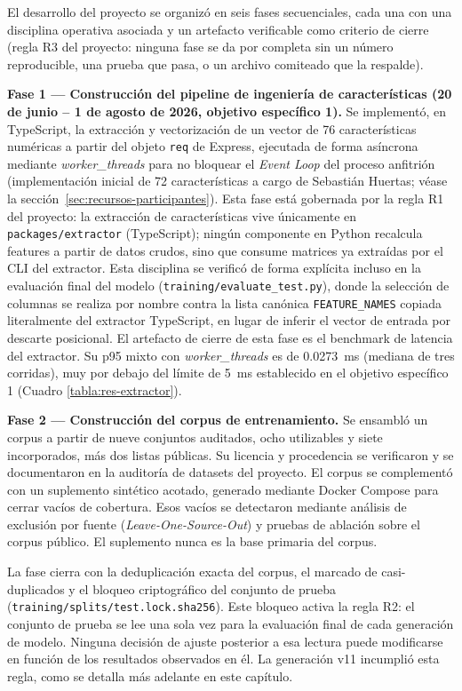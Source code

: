 El desarrollo del proyecto se organizó en seis fases secuenciales, cada una con una disciplina operativa asociada y un artefacto verificable como criterio de cierre (regla R3 del proyecto: ninguna fase se da por completa sin un número reproducible, una prueba que pasa, o un archivo comiteado que la respalde).

\textbf{Fase 1 --- Construcción del pipeline de ingeniería de características (20 de junio -- 1 de agosto de 2026, objetivo específico 1).} Se implementó, en TypeScript, la extracción y vectorización de un vector de 76 características numéricas a partir del objeto \texttt{req} de Express, ejecutada de forma asíncrona mediante \textit{worker\_threads} para no bloquear el \textit{Event Loop} del proceso anfitrión (implementación inicial de 72 características a cargo de Sebastián Huertas; véase la sección~\ref{sec:recursos-participantes}). Esta fase está gobernada por la regla R1 del proyecto: la extracción de características vive únicamente en \texttt{packages/extractor} (TypeScript); ningún componente en Python recalcula features a partir de datos crudos, sino que consume matrices ya extraídas por el CLI del extractor. Esta disciplina se verificó de forma explícita incluso en la evaluación final del modelo (\texttt{training/evaluate\_test.py}), donde la selección de columnas se realiza por nombre contra la lista canónica \texttt{FEATURE\_NAMES} copiada literalmente del extractor TypeScript, en lugar de inferir el vector de entrada por descarte posicional. El artefacto de cierre de esta fase es el benchmark de latencia del extractor. Su p95 mixto con \textit{worker\_threads} es de 0.0273~ms (mediana de tres corridas), muy por debajo del límite de 5~ms establecido en el objetivo específico 1 (Cuadro \ref{tabla:res-extractor}).

\textbf{Fase 2 --- Construcción del corpus de entrenamiento.} Se ensambló un corpus a partir de nueve conjuntos auditados, ocho utilizables y siete incorporados, más dos listas públicas. Su licencia y procedencia se verificaron y se documentaron en la auditoría de datasets del proyecto. El corpus se complementó con un suplemento sintético acotado, generado mediante Docker Compose para cerrar vacíos de cobertura. Esos vacíos se detectaron mediante análisis de exclusión por fuente (\textit{Leave-One-Source-Out}) y pruebas de ablación sobre el corpus público. El suplemento nunca es la base primaria del corpus.

La fase cierra con la deduplicación exacta del corpus, el marcado de casi-duplicados y el bloqueo criptográfico del conjunto de prueba (\texttt{training/splits/test.lock.sha256}). Este bloqueo activa la regla R2: el conjunto de prueba se lee una sola vez para la evaluación final de cada generación de modelo. Ninguna decisión de ajuste posterior a esa lectura puede modificarse en función de los resultados observados en él. La generación v11 incumplió esta regla, como se detalla más adelante en este capítulo.

